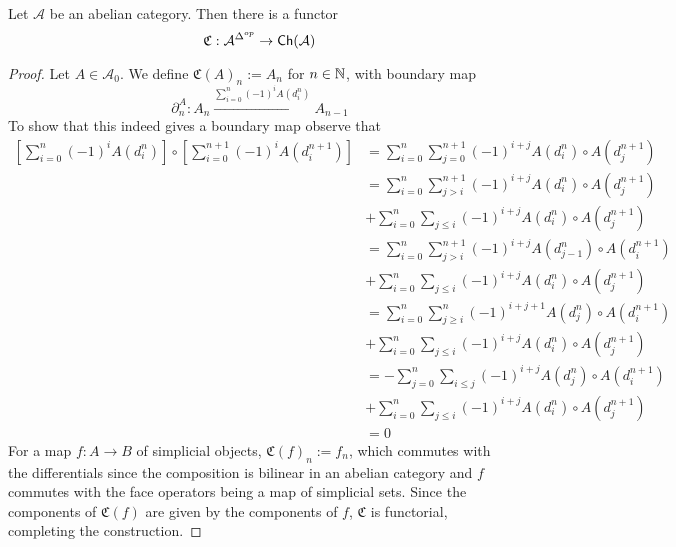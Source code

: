 \begin{prop}[label=prop:simpToNiceCh]
    Let $\mathcal{A}$ be an abelian category. Then there is a functor 
    \begin{equation*}
        \mathfrak{C}:\mathcal{A}^{\Delta^{op}}\to \textup{\textsf{Ch}}(\mathcal{A})
    \end{equation*}
\end{prop}
\begin{proof}
    Let $A \in \mathcal{A}_0$. We define $\mathfrak{C}(A)_n := A_n$ for $n \in \mathbb N$, with boundary map
    \begin{equation*}
        \partial_n^A:A_n\xrightarrow{\sum_{i=0}^n(-1)^iA(d_i^n)} A_{n-1}
    \end{equation*}
    To show that this indeed gives a boundary map observe that
    \begin{align*}
        \left[\sum_{i=0}^n(-1)^iA(d_i^n)\right]\circ \left[\sum_{i=0}^{n+1}(-1)^iA(d_i^{n+1})\right] &= \sum_{i=0}^n\sum_{j=0}^{n+1}(-1)^{i+j}A(d_i^n)\circ A(d_j^{n+1}) \\ 
        &= \sum_{i=0}^n\sum_{j > i}^{n+1}(-1)^{i+j}A(d_i^n)\circ A(d_j^{n+1}) \\
        &+ \sum_{i=0}^n\sum_{j\leq i}(-1)^{i+j}A(d_i^n)\circ A(d_j^{n+1}) \\
        &= \sum_{i=0}^n\sum_{j > i}^{n+1}(-1)^{i+j}A(d_{j-1}^n)\circ A(d_i^{n+1}) \\
        &+ \sum_{i=0}^n\sum_{j\leq i}(-1)^{i+j}A(d_i^n)\circ A(d_j^{n+1}) \\ 
        &= \sum_{i=0}^n\sum_{j \geq i}^{n}(-1)^{i+j+1}A(d_{j}^n)\circ A(d_i^{n+1}) \\
        &+ \sum_{i=0}^n\sum_{j\leq i}(-1)^{i+j}A(d_i^n)\circ A(d_j^{n+1}) \\ 
        &= -\sum_{j=0}^n\sum_{i\leq j}(-1)^{i+j}A(d_{j}^n)\circ A(d_i^{n+1}) \\
        &+ \sum_{i=0}^n\sum_{j\leq i}(-1)^{i+j}A(d_i^n)\circ A(d_j^{n+1}) \\
        &= 0
    \end{align*}
    For a map $f:A\to B$ of simplicial objects, $\mathfrak{C}(f)_n := f_n$, which commutes with the differentials since the composition is bilinear in an abelian category and $f$ commutes with the face operators being a map of simplicial sets. Since the components of $\mathfrak{C}(f)$ are given by the components of $f$, $\mathfrak{C}$ is functorial, completing the construction.
\end{proof}

